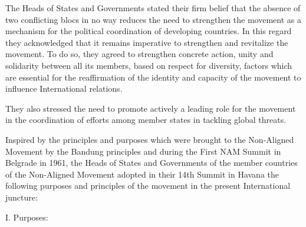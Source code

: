 \documentclass[
  openany]{book}
\begin{document}
The Heads of States and Governments stated their firm belief that the absence of two conflicting blocs in no way reduces the need to strengthen the movement as a mechanism for the political coordination of developing countries. In this regard they acknowledged that it remains imperative to strengthen and revitalize the movement. To do so, they agreed to strengthen concrete action, unity and solidarity between all its members, based on respect for diversity, factors which are essential for the reaffirmation of the identity and capacity of the movement to influence International relations.

They also stressed the need to promote actively a leading role for the movement in the coordination of efforts among member states in tackling global threats.

Inspired by the principles and purposes which were brought to the Non-Aligned Movement by the Bandung principles and during the First NAM Summit in Belgrade in 1961, the Heads of States and Governments of the member countries of the Non-Aligned Movement adopted in their 14th Summit in Havana the following purposes and principles of the movement in the present International juncture:

I. Purposes:
\end{document}
